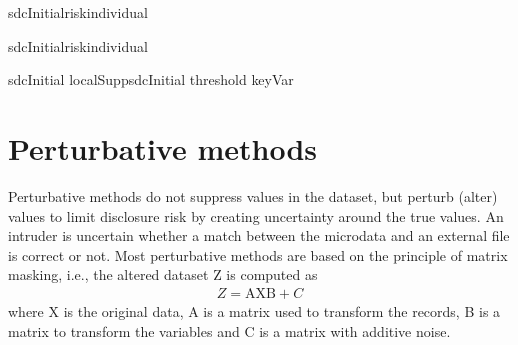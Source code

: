 \documentclass[letterpaper,10pt,english]{sphinxmanual}
\begin{document}
\def\sphinxLiteralBlockLabel{\label{\detokenize{anon_methods:code511}}}
%
\begin{sphinxVerbatim}[commandchars=\\\{\},numbers=left,firstnumber=1,stepnumber=1]
 sdcInitialriskindividual\PYG{p}{[}\PYG{p}{]}

 sdcInitialriskindividual\PYG{p}{[}\PYG{p}{]}  

 sdcInitial  localSuppsdcInitial threshold   keyVar  
\end{sphinxVerbatim}


\section{Perturbative methods}
\label{\detokenize{anon_methods:perturbative-methods}}
Perturbative methods do not suppress values in the dataset, but perturb
(alter) values to limit disclosure risk by creating uncertainty around
the true values. An intruder is uncertain whether a match between the
microdata and an external file is correct or not. Most perturbative
methods are based on the principle of matrix masking, i.e., the altered
dataset Z is computed as
\begin{equation*}
\begin{split}Z = \text{AXB} + C\end{split}
\end{equation*}
where X is the original data, A is a matrix used to transform the
records, B is a matrix to transform the variables and C is a matrix with
additive noise.
\end{document}
